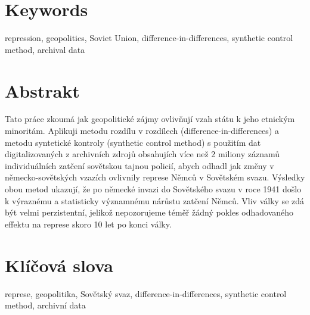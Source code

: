 \section*{Keywords}
repression, geopolitics, Soviet Union, difference-in-differences, synthetic control method,  archival data \\
\newpage
\section*{Abstrakt}
Tato práce zkoumá jak geopolitické zájmy ovlivňují vzah státu k jeho etnickým minoritám. 
Aplikuji metodu rozdílu v rozdílech (difference-in-differences) a metodu syntetické kontroly (synthetic control method) s použitím  dat digitalizovaných z archivních zdrojů obsahujích více než 2 miliony záznamů individuálních zatčení sovětskou tajnou policií, abych odhadl jak změny v německo-sovětských vzazích ovlivnily represe Němců v Sovětském svazu.  
Výsledky obou metod ukazují, že po německé invazi do Sovětského svazu v roce 1941 došlo k výraznému a statisticky významnému nárůstu zatčení Němců. 
Vliv války  se zdá být velmi perzistentní, jelikož nepozorujeme téměř  žádný pokles odhadovaného effektu na represe skoro 10 let po konci války.%

\section*{Klíčová slova}
represe, geopolitika, Sovětský svaz, difference-in-differences, synthetic control method, archivní data\\

\newpage
